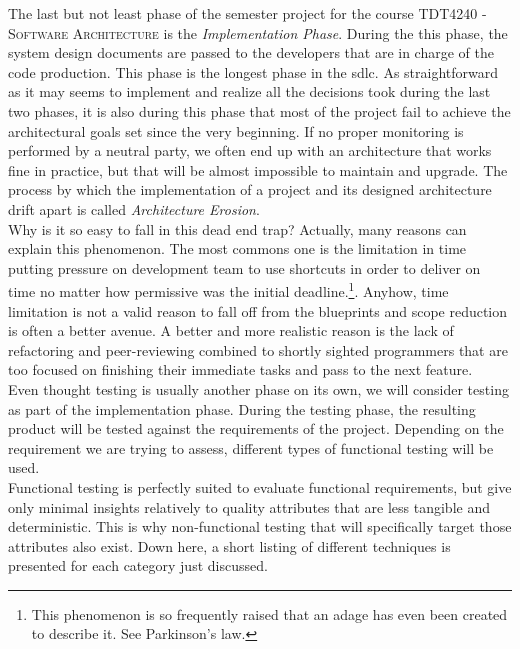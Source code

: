 
The last but not least phase of the semester project for the course \textsc{TDT4240 - Software Architecture} is the \textit{Implementation Phase}. During the this phase, the system design documents are passed to the developers that are in charge of the code production. This phase is the longest phase in the \gls{sdlc}. As straightforward as it may seems to implement and realize all the decisions took during the last two phases, it is also during this phase that most of the project fail to achieve the architectural goals set since the very beginning. If no proper monitoring is performed by a neutral party, we often end up with an architecture that works fine in practice, but that will be almost impossible to maintain and upgrade. The process by which the implementation of a project and its designed architecture drift apart is called \textit{Architecture Erosion}. \cite[Chapter 19]{bass2013}
 \\

Why is it so easy to fall in this dead end trap? Actually, many reasons can explain this phenomenon. The most commons one is the limitation in time putting pressure on development team to use shortcuts in order to deliver on time no matter how permissive was the initial deadline.\footnote{This phenomenon is so frequently raised that an adage has even been created to describe it. See Parkinson's law.\cite{wiki:parkinsonLaw}}. Anyhow, time limitation is not a valid reason to fall off from the blueprints and scope reduction is often a better avenue. A better and more realistic reason is the lack of refactoring and peer-reviewing combined to shortly sighted programmers that are too focused on finishing their immediate tasks and pass to the next feature. \\

Even thought testing is usually another phase on its own, we will consider testing as part of the implementation phase. During the testing phase, the resulting product will be tested against the requirements of the project. Depending on the requirement we are trying to assess, different types of functional testing will be used. \cite{istqbexamSDLC} \\
Functional testing is perfectly suited to evaluate functional requirements, but give only minimal insights relatively to quality attributes that are less tangible and deterministic. This is why non-functional testing that will specifically target those attributes also exist. Down here, a short listing of different techniques is presented for each category just discussed. \\

